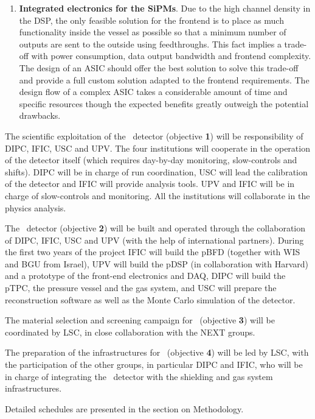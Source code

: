 \begin{enumerate}
\item {\bf Integrated electronics for the SiPMs}. Due to the high channel density in the DSP, the only feasible solution for the frontend is to place as much functionality inside the vessel as possible so that a minimum number of outputs are sent to the outside using feedthroughs. This fact implies a trade-off with power consumption, data output bandwidth and frontend complexity. The design of an ASIC should offer the best solution to solve this trade-off and provide a full custom solution adapted to the frontend requirements. The design flow of a complex ASIC takes a considerable amount of time and specific resources though the expected benefits greatly outweigh the potential drawbacks.
\end{enumerate}

\indent

The scientific exploitation of the \Next\ detector (objective {\bf 1}) will be responsibility of DIPC, IFIC,  USC and UPV. The four institutions will cooperate in the operation of the detector itself (which requires day-by-day monitoring, slow-controls and shifts). DIPC will be in charge of run coordination, USC will lead the calibration of the detector and IFIC will provide analysis tools. UPV and IFIC will be in charge of slow-controls and monitoring. All the institutions will collaborate in the physics analysis.  

\indent

The \HDEMO\ detector (objective {\bf 2}) will be built and operated through the collaboration of DIPC, IFIC, USC and UPV (with the help of international partners). 
During the first two years of the project IFIC will build the pBFD (together with WIS and BGU from Israel), UPV will build the pDSP (in collaboration with Harvard) and a prototype of the front-end electronics and DAQ, DIPC will build the pTPC, the pressure vessel and the gas system, and USC will prepare the reconstruction software as well as the Monte Carlo simulation of the detector. 

The material selection and screening campaign for \NHD\ (objective {\bf 3})  will be coordinated by LSC, in close collaboration with the NEXT groups. 

The preparation of the infrastructures for \NHD\ (objective {\bf 4})  will be led by LSC, with the participation of the other groups, in particular DIPC and IFIC, who will be in charge of integrating the \NHD\ detector with the shielding and gas system infrastructures.

Detailed schedules are presented in the section on Methodology.  
  